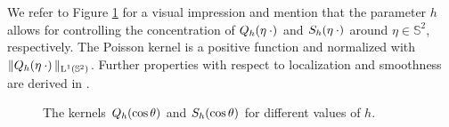 \documentclass[11pt,a4paper,twoside,bibtotoc]{scrartcl}
\theoremstyle{plain}
\theoremstyle{definition}
\theoremstyle{remark}
\newcommand{\twosphere}{\ensuremath{\mathbb{S}^2}}
\newcommand{\Ln}[2]{\ensuremath{\text{\rm{L}}^{#1}\left(#2\right)}}
\newcommand{\fun}[2]{\ensuremath{#1{\hspace{-0.4ex}}\left(#2\right)}}
\newcommand{\mb}[1]{\mathbf{#1}}
\newcommand{\V}[1]{\mb{#1}}
\numberwithin{equation}{section}
\numberwithin{table}{section}
\numberwithin{figure}{section}
\begin{document}
We refer to Figure \ref{Basics:Figure:PoissonSingularityKernel} for a visual
impression and mention that the parameter $h$ allows for controlling the
concentration of $\fun{Q_{h}}{\V{\eta} \: \cdot}$ and $\fun{S_{h}}{\V{\eta} \:
  \cdot}$ around $\eta \in \twosphere$, respectively.
The Poisson kernel is a positive function and normalized with
$\|\fun{Q_{h}}{\V{\eta} \: \cdot}\|_{\Ln{1}{\twosphere}}$.
Further properties with respect to localization and smoothness are derived
in \cite[pp. 112]{frgesc}.

\begin{figure}[tb]
  \centering
  \hfill
  \caption{The kernels $\fun{Q_{h}}{\cos\theta}$ and $\fun{S_{h}}{\cos\theta}$
  for different values of $h$.}
  \label{Basics:Figure:PoissonSingularityKernel}
\end{figure}
\end{document}
